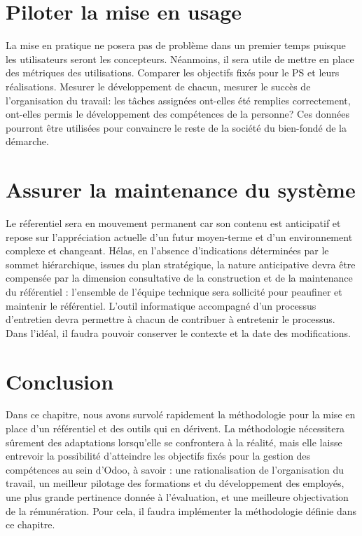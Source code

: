 \section{Piloter la mise en usage}
La mise en pratique ne posera pas de problème dans un premier temps puisque les utilisateurs seront les concepteurs. Néanmoins, il sera utile de mettre en place des métriques des utilisations. Comparer les objectifs fixés pour le PS et leurs réalisations. Mesurer le développement de chacun, mesurer le succès de l'organisation du travail: les tâches assignées ont-elles été remplies correctement, ont-elles permis le développement des compétences de la personne? Ces données pourront être utilisées pour convaincre le reste de la société du bien-fondé de la démarche. 

\section{Assurer la maintenance du système}
 Le réferentiel sera en mouvement permanent car son contenu est anticipatif et repose sur l’appréciation actuelle d’un futur moyen-terme et d’un environnement complexe et changeant. Hélas, en l'absence d'indications déterminées par le sommet hiérarchique, issues du plan stratégique, la nature anticipative devra être compensée par la dimension consultative de la construction et de la maintenance du référentiel : l’ensemble de l’équipe technique sera sollicité pour peaufiner et maintenir le référentiel. L'outil informatique accompagné d'un processus d'entretien devra permettre à chacun de contribuer à entretenir le processus. Dans l'idéal, il faudra pouvoir conserver le contexte et la date des modifications.
 
 
 \section{Conclusion}
 Dans ce chapitre, nous avons survolé rapidement la méthodologie pour la mise en place d'un référentiel et des outils qui en dérivent. La méthodologie nécessitera sûrement des adaptations lorsqu'elle se confrontera à la réalité, mais elle laisse entrevoir la possibilité d'atteindre les objectifs fixés pour la gestion des compétences au sein d'Odoo, à savoir : une rationalisation de l'organisation du travail, un meilleur pilotage des formations et du développement des employés, une plus grande pertinence donnée à l'évaluation, et une meilleure objectivation de la rémunération. Pour cela, il faudra implémenter la méthodologie définie dans ce chapitre.

